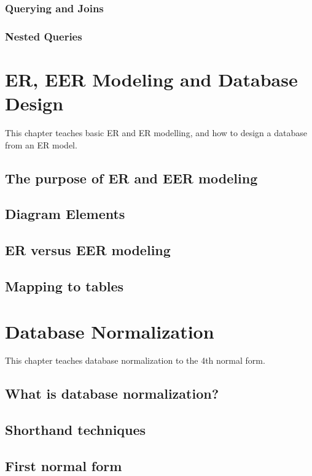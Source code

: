 \subsection{Querying and Joins}
\subsection{Nested Queries}

\chapter{ER, EER Modeling and Database Design}
\label{chap:relational:eer-modeling-and-database-design}
This chapter teaches basic ER and ER modelling, and how to design a database from an ER model.

\section{The purpose of ER and EER modeling}
\section{Diagram Elements}
\section{ER versus EER modeling}
\section{Mapping to tables}

\chapter{Database Normalization}
\label{chap:relational:database-normalization}
This chapter teaches database normalization to the 4th normal form.

\section{What is database normalization?}
\section{Shorthand techniques}
\section{First normal form}
